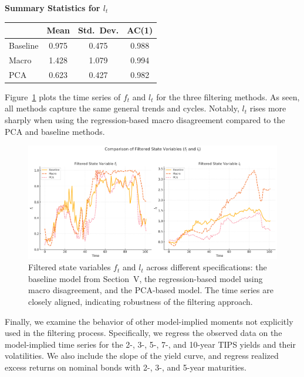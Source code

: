 \begin{table}[H]
    \vspace{1em}
    
    \textbf{Summary Statistics for $l_t$} \\
    \begin{tabular}{lccc}
        \toprule
        & \textbf{Mean} & \textbf{Std.\ Dev.} & \textbf{AC(1)} \\
        \midrule
        Baseline & 0.975 & 0.475 & 0.988 \\
        Macro    & 1.428 & 1.079 & 0.994 \\
        PCA      & 0.623 & 0.427 & 0.982 \\
        \bottomrule
    \end{tabular}
\end{table}
Figure~\ref{fig:FilteredStates} plots the time series of $f_t$ and $l_t$ for the three filtering methods. As seen, all methods capture the same general trends and cycles. Notably, $l_t$ rises more sharply when using the regression-based macro disagreement compared to the PCA and baseline methods.

\begin{figure}[H]
    \centering
    \includegraphics[width=\textwidth]{figures/Filter.png}
    \caption{Filtered state variables $f_t$ and $l_t$ across different specifications: the baseline model from Section~V, the regression-based model using macro disagreement, and the PCA-based model. The time series are closely aligned, indicating robustness of the filtering approach.}
    \label{fig:FilteredStates}
\end{figure}

Finally, we examine the behavior of other model-implied moments not explicitly used in the filtering process. Specifically, we regress the observed data on the model-implied time series for the 2-, 3-, 5-, 7-, and 10-year TIPS yields and their volatilities. We also include the slope of the yield curve, and regress realized excess returns on nominal bonds with 2-, 3-, and 5-year maturities.

